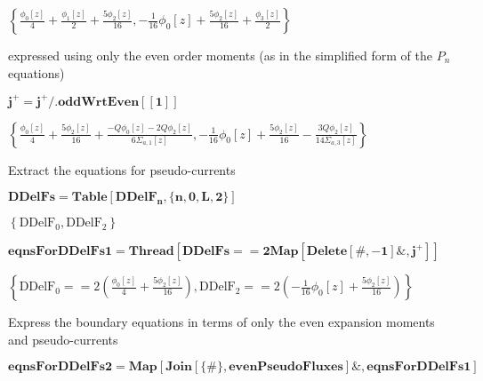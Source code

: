 \documentclass{article}
\begin{document}
\begin{doublespace}
\noindent\(\left\{\frac{\phi _0[z]}{4}+\frac{\phi _1[z]}{2}+\frac{5 \phi _2[z]}{16},-\frac{1}{16} \phi _0[z]+\frac{5 \phi _2[z]}{16}+\frac{\phi _3[z]}{2}\right\}\)
\end{doublespace}

expressed using only the even order moments (as in the simplified form of the \(P_n\) equations)

\begin{doublespace}
\noindent\(\pmb{j^+=j^+\text{/.}\text{oddWrtEven}[[1]]}\)
\end{doublespace}

\begin{doublespace}
\noindent\(\left\{\frac{\phi _0[z]}{4}+\frac{5 \phi _2[z]}{16}+\frac{-Q \phi _0[z]-2 Q \phi _2[z]}{6 \Sigma _{a,1}[z]},-\frac{1}{16} \phi _0[z]+\frac{5
\phi _2[z]}{16}-\frac{3 Q \phi _2[z]}{14 \Sigma _{a,3}[z]}\right\}\)
\end{doublespace}

Extract the equations for pseudo-currents

\begin{doublespace}
\noindent\(\pmb{\text{DDelFs}=\text{Table}\left[\text{DDelF}_n,\{n,0,L,2\}\right]}\)
\end{doublespace}

\begin{doublespace}
\noindent\(\left\{\text{DDelF}_0,\text{DDelF}_2\right\}\)
\end{doublespace}

\begin{doublespace}
\noindent\(\pmb{\text{eqnsForDDelFs1}=\text{Thread}\left[\text{DDelFs}==2\text{Map}\left[\text{Delete}[\#,-1]\&,j^+\right]\right]}\)
\end{doublespace}

\begin{doublespace}
\noindent\(\left\{\text{DDelF}_0==2 \left(\frac{\phi _0[z]}{4}+\frac{5 \phi _2[z]}{16}\right),\text{DDelF}_2==2 \left(-\frac{1}{16} \phi _0[z]+\frac{5
\phi _2[z]}{16}\right)\right\}\)
\end{doublespace}

Express the boundary equations in terms of only the even expansion moments and pseudo-currents

\begin{doublespace}
\noindent\(\pmb{\text{eqnsForDDelFs2}=\text{Map}[\text{Join}[\{\#\},\text{evenPseudoFluxes}]\&,\text{eqnsForDDelFs1}]}\)
\end{doublespace}
\end{document}
